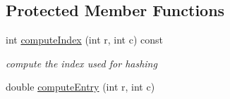 \subsection*{Protected Member Functions}
\begin{DoxyCompactItemize}
\item 
int \mbox{\hyperlink{classg2o_1_1_marginal_covariance_cholesky_a9b0816374af957f23aa2d6b015e4b9bf}{compute\+Index}} (int r, int c) const
\begin{DoxyCompactList}\small\item\em compute the index used for hashing \end{DoxyCompactList}\item 
double \mbox{\hyperlink{classg2o_1_1_marginal_covariance_cholesky_a556f8da80f0873b74b57c82b587b4f97}{compute\+Entry}} (int r, int c)
\end{DoxyCompactItemize}
